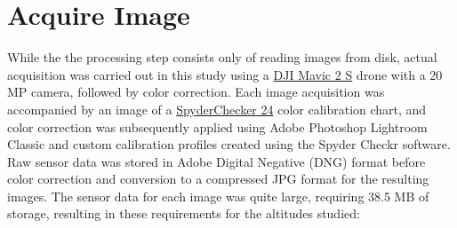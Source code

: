 \documentclass[letterpaper]{article}
\begin{document}
\section{Acquire Image}
While the the processing step consists only of reading images from disk, actual acquisition was carried out in this study using a \href{https://www.dji.com/air-2s/specs} {DJI Mavic 2 S} drone with a 20 MP camera, followed by color correction. Each image acquisition was accompanied by an image of a \href{https://www.datacolor.com/spyder/products/spyder-checkr-photo/} {SpyderChecker 24} color calibration chart, and color correction was subsequently applied using Adobe Photoshop Lightroom Classic and custom calibration profiles created using the Spyder Checkr software. Raw sensor data was stored in Adobe Digital Negative (DNG) format before color correction and conversion to a compressed JPG format for the resulting images. The sensor data for each image was quite large, requiring 38.5 MB of storage, resulting in these requirements for the altitudes studied:
\end{document}
